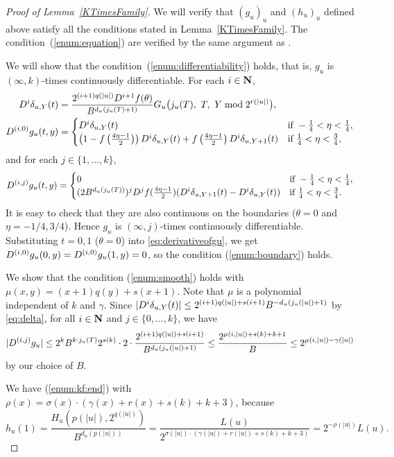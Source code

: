 \begin{proof}[Proof of Lemma~\ref{KTimesFamily}]
We will verify that $(g_u)_u$ and $(h_u)_u$ defined above satisfy all the conditions stated in Lemma~\ref{KTimesFamily}.
The condition~(\ref{enum:equation}) are verified by the same argument as
\cite[Lemma 4.1]{kawamura2010lipschitz}.

We will show that the condition~(\ref{enum:differentiability}) holds, that is, $g _u$ is $(\infty, k)$-times continuously differentiable.
For each $i \in \mathbf N$,
  \begin{align}
   D^i \delta_{u,Y}(t) 
&
    = \frac{2^{(i+1)q(|u|)} D^{i+1}f(\theta)}{B^{d_u(j_u(T)+1)}}
    G_u\bigl( j_u(T),\ T,\ Y \bmod 2^{r(|u|)} \bigr),
\\
   \label{eq:derivativeofgu}
    D^{(i,0)} g_u(t, y)
&
     = \begin{cases}
 	D^i \delta_{u, Y}(t) 
	& \text{if} \ - \frac 1 4 < \eta < \frac 1 4, \\
	\left( 1-f \left(\frac{4\eta-1}{2}\right)\right) 
	D^i \delta_{u, Y}(t)
	+ f \left(\frac{4\eta-1}{2}\right) D^i \delta_{u,Y+1}(t) 
	& \text{if} \ \frac 1 4 < \eta < \frac 3 4,
       \end{cases}
  \end{align}
and for each  $j \in \{1, \dots , k\}$,
  \begin{equation}
    D^{(i,j)} g_u(t, y)
     = \begin{cases}
	0 & \text{if} \ - \frac 1 4 < \eta < \frac 1 4, \\
	(2B^{d_u(j_u(T))})^j D^j f(\frac{4\eta - 1}2)
	(D^i \delta_{u,Y+1}(t)-D^i \delta_{u, Y}(t)) 
	& \text{if} \ \frac 1 4 < \eta < \frac 3 4.
       \end{cases}
  \end{equation}
It is easy to check that they are also continuous on the boundaries 
($\theta = 0$ and $\eta = -1/4, 3/4$).
Hence $g _u$ is $(\infty, j)$-times continuously differentiable.
Substituting $t = 0, 1$ ($\theta = 0$) into \eqref{eq:derivativeofgu},
we get $D^{(i, 0)} g_u(0,y) = D^{(i, 0)} g_u(1,y) = 0$, 
so the condition (\ref{enum:boundary}) holds.

We show that the condition (\ref{enum:smooth}) holds with $\mu(x, y) = (x+1)q(y) + s(x+1)$.
Note that $\mu$ is a polynomial independent of $k$ and $\gamma$.
Since $|D^i \delta_{u,Y}(t)| \le 2^{(i+1)q(|u|) + s(i+1)}B^{-d_u(j_u(|u|)+1)}$ by \eqref{eq:delta}, for all $i \in \mathbf N$ and $j \in \{0, \dots, k\}$, we have
 \begin{equation}
  |D^{(i,j)} g_u| 
   \le 
   2^k B^{k \cdot j_u(T)} 2^{s(k)} \cdot 2 \cdot 
   \frac{2^{(i+1)q(|u|) + s(i+1)}}{B^{d_u(j_u(|u|)+1)}} 
   \le
   \frac{2^{\mu(i, |u|) + s(k) + k + 1}}{B}
   \le
   2^{\mu(i, |u|) - \gamma(|u|)}
 \end{equation}
 by our choice of $B$.

We have (\ref{enum:kf:end}) with
  $\rho(x) = \sigma(x) \cdot (\gamma(x)+r(x)+s(k)+k+3)$, because
  \begin{equation}
   h_u(1) = \frac{H_u(p(|u|), 2^{q(|u|)})}{B^{d_u(p(|u|))}} 
          = \frac{L(u)}{2^{\sigma(|u|) \cdot (\gamma(|u|)+r(|u|)+s(k)+k+3)}}
	  = 2^{-\rho(|u|)} L(u).
  \end{equation}
 \end{proof}

